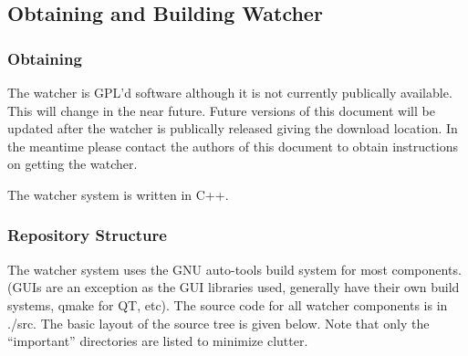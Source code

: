 \documentclass{article}
\begin{document}
\subsection{Obtaining and Building Watcher}
\subsubsection{Obtaining}
The watcher is GPL'd software although it is not currently publically available. This will change in the near future. Future versions of this 
document will be updated after the watcher is publically released giving the download location. In the meantime please contact the authors 
of this document to obtain instructions on getting the watcher. 

The watcher system is written in C++. 

\subsubsection{Repository Structure}
The watcher system uses the GNU auto-tools build system for most components. (GUIs are an exception as the GUI libraries used, generally have 
their own build systems, qmake for QT, etc).  The source code for all watcher components is in .\slash src. The basic layout of the source tree is given
below. Note that only the ``important'' directories are listed to minimize clutter. 
\end{document}
